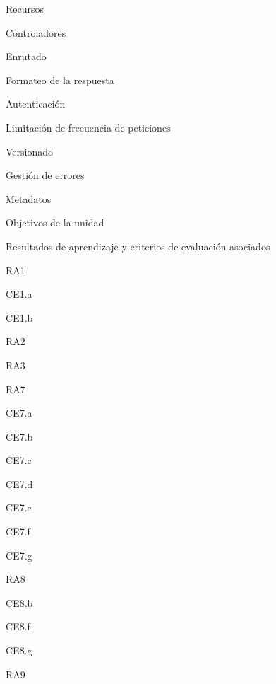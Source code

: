 \begin{longenum}
\begin{longenum}
        \item Recursos
        \item Controladores
        \item Enrutado
        \item Formateo de la respuesta
        \item Autenticación
        \item Limitación de frecuencia de peticiones
        \item Versionado
        \item Gestión de errores
        \item Metadatos
        \begin{longenum}
            \item Objetivos de la unidad
            \item Resultados de aprendizaje y criterios de evaluación asociados
            \begin{longenum}
                \item RA1
                \begin{longenum}
                    \item CE1.a
                    \item CE1.b
                \end{longenum}
                \item RA2
                \item RA3
                \item RA7
                \begin{longenum}
                    \item CE7.a
                    \item CE7.b
                    \item CE7.c
                    \item CE7.d
                    \item CE7.e
                    \item CE7.f
                    \item CE7.g
                \end{longenum}
                \item RA8
                \begin{longenum}
                    \item CE8.b
                    \item CE8.f
                    \item CE8.g
                \end{longenum}
                \item RA9

\end{longenum}
\end{longenum}
\end{longenum}
\end{longenum}
